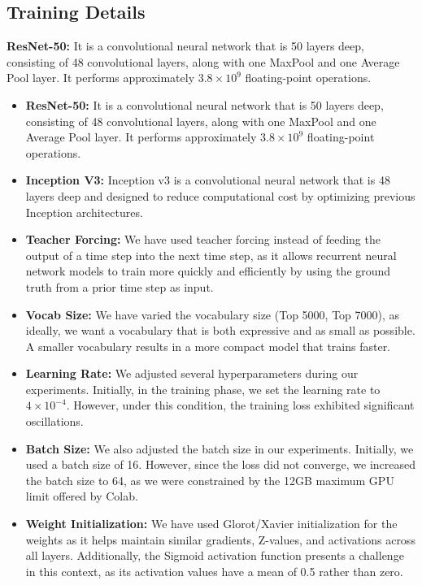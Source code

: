 \documentclass{article}
\begin{document}
\subsection{Training Details}

\textbf{ResNet-50:} It is a convolutional neural network that is 50 layers deep, consisting of 48 convolutional layers, along with one MaxPool and one Average Pool layer. It performs approximately \(3.8 \times 10^9\) floating-point operations. 

\begin{itemize}
    \item[] \textbf{ResNet-50:} It is a convolutional neural network that is 50 layers deep, consisting of 48 convolutional layers, along with one MaxPool and one Average Pool layer. It performs approximately \(3.8 \times 10^9\) floating-point operations.
    
    \item[] \textbf{Inception V3:} Inception v3 is a convolutional neural network that is 48 layers deep and designed to reduce computational cost by optimizing previous Inception architectures.

    \item[] \textbf{Teacher Forcing:} We have used teacher forcing instead of feeding the output of a time step into the next time step, as it allows recurrent neural network models to train more quickly and efficiently by using the ground truth from a prior time step as input.

    \item[] \textbf{Vocab Size:} We have varied the vocabulary size (Top 5000, Top 7000), as ideally, we want a vocabulary that is both expressive and as small as possible. A smaller vocabulary results in a more compact model that trains faster.

    \item[] \textbf{Learning Rate:} We adjusted several hyperparameters during our experiments. Initially, in the training phase, we set the learning rate to \(4 \times 10^{-4}\). However, under this condition, the training loss exhibited significant oscillations.

    \item[] \textbf{Batch Size:} We also adjusted the batch size in our experiments. Initially, we used a batch size of 16. However, since the loss did not converge, we increased the batch size to 64, as we were constrained by the 12GB maximum GPU limit offered by Colab.

    \item[] \textbf{Weight Initialization:} We have used Glorot/Xavier initialization for the weights as it helps maintain similar gradients, Z-values, and activations across all layers. Additionally, the Sigmoid activation function presents a challenge in this context, as its activation values have a mean of 0.5 rather than zero.
\end{itemize}
\end{document}
